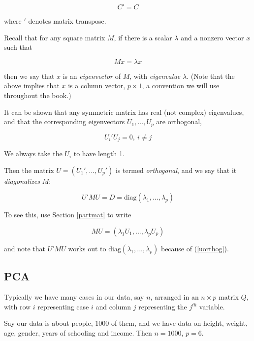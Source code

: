 \begin{equation}
C' = C
\end{equation}

where $'$ denotes matrix transpose.  

Recall that for any square matrix $M$, if there is a scalar $\lambda$
and a nonzero vector $x$ such that 

\begin{equation}
Mx = \lambda x
\end{equation}

then we say that $x$ is an \textit{eigenvector} of $M$, with
\textit{eigenvalue} $\lambda$.  (Note that the above implies that $x$ is
a column vector, $p \times 1$, a convention we will use throughout the
book.)

It can be shown that any symmetric matrix has real (not complex)
eigenvalues, and that the corresponding eigenvectors $U_1,...,U_p$
are orthogonal,

\begin{equation}
\label{uorthog}
U_i' U_j = 0, ~ i \neq j
\end{equation}

We always take the $U_i$ to have length 1.  

Then the matrix $U = (U_1',...,U_p')$ is termed \textit{orthogonal}, and
we say that it \textit{diagonalizes} $M$:

\begin{equation}
\label{diag}
U'MU = D = \textrm{diag}(\lambda_1,...,\lambda_p)
\end{equation}

To see this, use Section \ref{partmat} to write

\begin{equation}
MU = (\lambda_1 U_1,...,\lambda_p U_p)
\end{equation}

and note that $U'MU$ works out to
$\textrm{diag}(\lambda_1,...,\lambda_p)$ because of (\ref{uorthog}).

\subsection{PCA}
\label{pcadef}

Typically we have many cases in our data, say $n$, arranged in an $n
\times p$ matrix $Q$, with row $i$ representing case $i$ and column $j$
representing the $j^{th}$ variable.

Say our data is about people, 1000 of them, and we have data on height,
weight, age, gender, years of schooling and income.  Then $n = 1000$, $p
= 6$.

